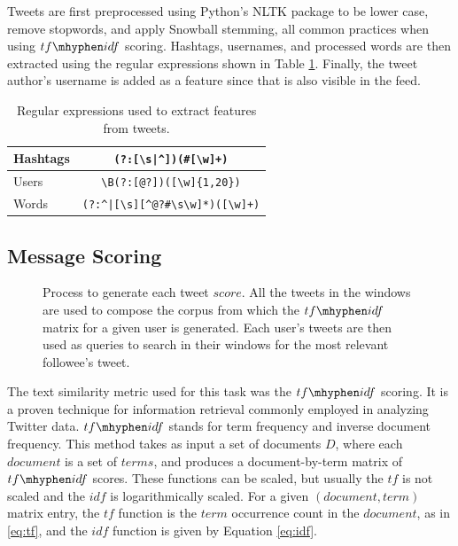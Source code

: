 Tweets are first preprocessed using Python's NLTK package \cite{Bird2009} to be lower case, remove stopwords, and apply Snowball stemming, all common practices when using $tf\mhyphen idf$ scoring.  Hashtags, usernames, and processed words are then extracted using the regular expressions shown in Table \ref{tab:regularExpressions}.  Finally, the tweet author's username is added as a feature since that is also visible in the feed.

\begin{table}[!tb]
	\fontsize{9pt}{10pt}\selectfont
	\centering
		\begin{tabular}{|l|c|}
			\hline
			Hashtags & \verb!(?:[\s|^])(#[\w]+)! \\ \hline
			Users & \verb!\B(?:[@?])([\w]{1,20})! \\ \hline
			Words & \verb!(?:^|[\s][^@?#\s\w]*)([\w]+)! \\ \hline
		\end{tabular}
		\caption{Regular expressions used to extract features from tweets.}
	\label{tab:regularExpressions}
\end{table}

\subsection{Message Scoring}

\begin{figure}[!tb]
\centering
\fontsize{9pt}{10pt}\selectfont

\caption{Process to generate each tweet $score$. All the tweets in the windows are used to compose the corpus from which the $tf\mhyphen idf$ matrix for a given user is generated. Each user's tweets are then used as queries to search in their windows for the most relevant followee's tweet.} 
\label{fig:fig_tfidf_explanation}
\end{figure}

The text similarity metric used for this task was the $tf\mhyphen idf$ scoring. It is a proven technique for information retrieval commonly employed in analyzing Twitter data. 
$tf\mhyphen idf$ stands for term frequency and inverse document frequency. This method takes as input a set of documents $D$, where each $document$ is a set of $terms$, and produces a document-by-term matrix of $tf\mhyphen idf$ scores. These functions can be scaled, but usually the $tf$ is not scaled and the $idf$ is logarithmically scaled. For a given $(document,term)$ matrix entry, the $tf$ function is the $term$ occurrence count in the $document$, as in \ref{eq:tf}, and the $idf$ function is given by Equation \ref{eq:idf}.

